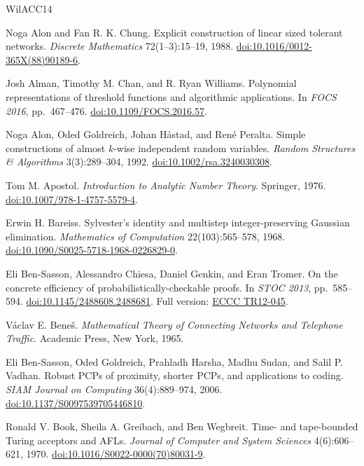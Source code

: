 \documentclass[11pt,letterpaper]{article}
\theoremstyle{definition}
\theoremstyle{remark}
\begin{document}
\clearpage
\begin{thebibliography}{WilACC14}
\raggedright

Noga Alon and Fan R. K. Chung. Explicit construction of linear sized
tolerant networks. \emph{Discrete Mathematics} 72(1--3):15--19, 1988.
\href{https://doi.org/10.1016/0012-365X(88)90189-6}{doi:10.1016/0012-365X(88)90189-6}.


Josh Alman, Timothy M. Chan, and R. Ryan Williams.
Polynomial representations of threshold functions and algorithmic
applications. In \emph{FOCS 2016}, pp.~467--476.
\href{https://doi.org/10.1109/FOCS.2016.57}{doi:10.1109/FOCS.2016.57}.

Noga Alon, Oded Goldreich, Johan H\aa{}stad, and Ren\'e Peralta.
Simple constructions of almost \(k\)-wise independent random variables.
\emph{Random Structures \& Algorithms} 3(3):289--304, 1992.
\href{https://doi.org/10.1002/rsa.3240030308}{doi:10.1002/rsa.3240030308}.


Tom M. Apostol. \emph{Introduction to Analytic Number Theory}.
Springer, 1976.
\href{https://doi.org/10.1007/978-1-4757-5579-4}{doi:10.1007/978-1-4757-5579-4}.


Erwin H. Bareiss. Sylvester's identity and multistep integer-preserving
Gaussian elimination. \emph{Mathematics of Computation}
22(103):565--578, 1968.
\href{https://doi.org/10.1090/S0025-5718-1968-0226829-0}{doi:10.1090/S0025-5718-1968-0226829-0}.

Eli Ben-Sasson, Alessandro Chiesa, Daniel Genkin, and Eran Tromer.
On the concrete efficiency of probabilistically-checkable proofs.
In \emph{STOC 2013}, pp.~585--594.
\href{https://doi.org/10.1145/2488608.2488681}{doi:10.1145/2488608.2488681}.
Full version: \href{https://eccc.weizmann.ac.il/report/2012/045/}{ECCC TR12-045}.

V\'aclav E. Bene\v{s}. \emph{Mathematical Theory of Connecting Networks
and Telephone Traffic}. Academic Press, New York, 1965.


Eli Ben-Sasson, Oded Goldreich, Prahladh Harsha, Madhu Sudan,
and Salil P. Vadhan. Robust PCPs of proximity, shorter PCPs, and
applications to coding. \emph{SIAM Journal on Computing}
36(4):889--974, 2006.
\href{https://doi.org/10.1137/S0097539705446810}{doi:10.1137/S0097539705446810}.

Ronald V. Book, Sheila A. Greibach, and Ben Wegbreit.
Time- and tape-bounded Turing acceptors and AFLs.
\emph{Journal of Computer and System Sciences} 4(6):606--621, 1970.
\href{https://doi.org/10.1016/S0022-0000(70)80031-9}{doi:10.1016/S0022-0000(70)80031-9}.



\end{thebibliography}
\end{document}
